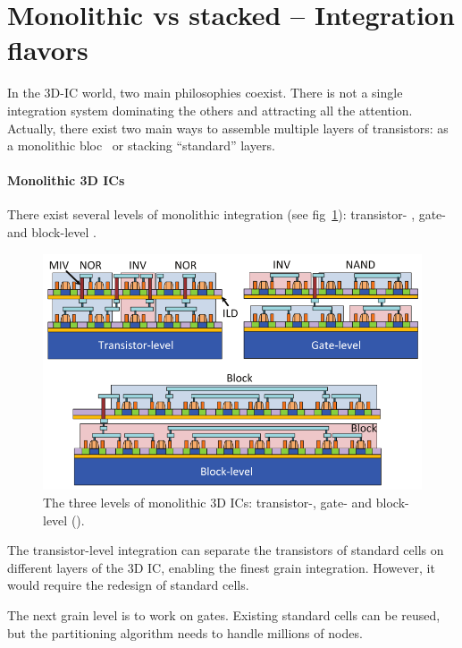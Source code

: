 \documentclass[11pt,a4paper]{report} %
\theoremstyle{customdef}
\begin{document}
\section{Monolithic vs stacked -- Integration flavors}\label{sec:int-flav}
In the 3D-IC world, two main philosophies coexist.
There is not a single integration system dominating the others and attracting all the attention.
Actually, there exist two main ways to assemble multiple layers of transistors: as a monolithic bloc~\citep[chap. 2]{Tan2008} or stacking “standard” layers\citep{Tan2008}.

\paragraph{Monolithic 3D ICs}
There exist several levels of monolithic integration (see fig~\ref{fig:m3d}): transistor- \citep{Lee2013, Samal2014}, gate- \citep{Panth, Panth2014} and block-level \citep{Panth2013}.

\begin{figure}
	\centering
	\includegraphics[width=.7\textwidth]{img/M3D-Lim.png}
	\caption{The three levels of monolithic 3D ICs: transistor-, gate- and block-level (\citet{Panth}).}
	\label{fig:m3d}
\end{figure}

The transistor-level integration can separate the transistors of standard cells on different layers of the 3D IC, enabling the finest grain integration.
However, it would require the redesign of standard cells.

The next grain level is to work on gates. %
Existing standard cells can be reused, but the partitioning algorithm needs to handle millions of nodes.
\end{document}

